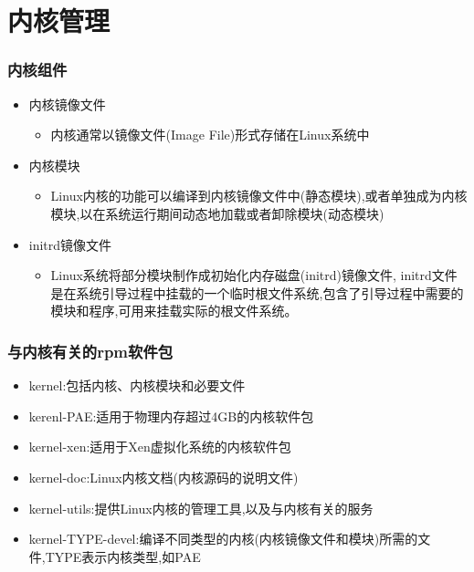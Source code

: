 \documentclass[xcolor=svgnames,presentation]{beamer}
\begin{document}
\section{内核管理}
\label{sec-2}
\begin{frame}
\frametitle{内核组件}
\label{sec-2-1}
\begin{itemize}

\item 内核镜像文件
\label{sec-2-1-1}%
\begin{itemize}

\item 内核通常以镜像文件(Image File)形式存储在Linux系统中
\label{sec-2-1-1-1}%
\end{itemize} %

\item 内核模块
\label{sec-2-1-2}%
\begin{itemize}

\item Linux内核的功能可以编译到内核镜像文件中(静态模块),或者单独成为内核模块,以在系统运行期间动态地加载或者卸除模块(动态模块)
\label{sec-2-1-2-1}%
\end{itemize} %

\item initrd镜像文件
\label{sec-2-1-3}%
\begin{itemize}

\item Linux系统将部分模块制作成初始化内存磁盘(initrd)镜像文件, initrd文件是在系统引导过程中挂载的一个临时根文件系统,包含了引导过程中需要的模块和程序,可用来挂载实际的根文件系统。
\label{sec-2-1-3-1}%
\end{itemize} %
\end{itemize} %
\end{frame}
\begin{frame}
\frametitle{与内核有关的rpm软件包}
\label{sec-2-2}
\begin{itemize}

\item kernel:包括内核、内核模块和必要文件
\label{sec-2-2-1}%

\item kerenl-PAE:适用于物理内存超过4GB的内核软件包
\label{sec-2-2-2}%

\item kernel-xen:适用于Xen虚拟化系统的内核软件包
\label{sec-2-2-3}%

\item kernel-doc:Linux内核文档(内核源码的说明文件)
\label{sec-2-2-4}%

\item kernel-utils:提供Linux内核的管理工具,以及与内核有关的服务
\label{sec-2-2-5}%

\item kernel-TYPE-devel:编译不同类型的内核(内核镜像文件和模块)所需的文件,TYPE表示内核类型,如PAE
\label{sec-2-2-6}%
\end{itemize} %
\end{frame}
\end{document}
